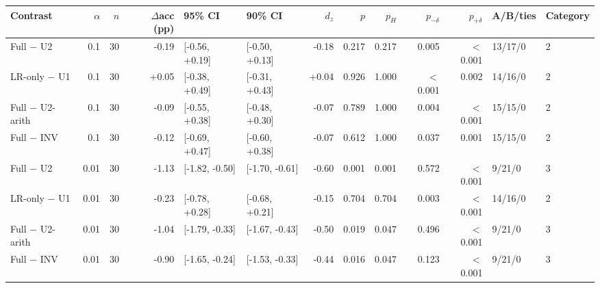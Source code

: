 \begin{tabular}{lrrrllrrrrrll}
\toprule
Contrast & $\alpha$ & $n$ & $\Delta$acc (pp) & 95\% CI & 90\% CI & $d_z$ & $p$ & $p_H$ & $p_{-\delta}$ & $p_{+\delta}$ & A/B/ties & Category \\
\midrule
Full $-$ U2 & 0.1 & 30 & -0.19 & [-0.56, +0.19] & [-0.50, +0.13] & -0.18 & 0.217 & 0.217 & 0.005 & $<$0.001 & 13/17/0 & 2 \\
LR-only $-$ U1 & 0.1 & 30 & +0.05 & [-0.38, +0.49] & [-0.31, +0.43] & +0.04 & 0.926 & 1.000 & $<$0.001 & 0.002 & 14/16/0 & 2 \\
Full $-$ U2-arith & 0.1 & 30 & -0.09 & [-0.55, +0.38] & [-0.48, +0.30] & -0.07 & 0.789 & 1.000 & 0.004 & $<$0.001 & 15/15/0 & 2 \\
Full $-$ INV & 0.1 & 30 & -0.12 & [-0.69, +0.47] & [-0.60, +0.38] & -0.07 & 0.612 & 1.000 & 0.037 & 0.001 & 15/15/0 & 2 \\
Full $-$ U2 & 0.01 & 30 & -1.13 & [-1.82, -0.50] & [-1.70, -0.61] & -0.60 & 0.001 & 0.001 & 0.572 & $<$0.001 & 9/21/0 & 3 \\
LR-only $-$ U1 & 0.01 & 30 & -0.23 & [-0.78, +0.28] & [-0.68, +0.21] & -0.15 & 0.704 & 0.704 & 0.003 & $<$0.001 & 14/16/0 & 2 \\
Full $-$ U2-arith & 0.01 & 30 & -1.04 & [-1.79, -0.33] & [-1.67, -0.43] & -0.50 & 0.019 & 0.047 & 0.496 & $<$0.001 & 9/21/0 & 3 \\
Full $-$ INV & 0.01 & 30 & -0.90 & [-1.65, -0.24] & [-1.53, -0.33] & -0.44 & 0.016 & 0.047 & 0.123 & $<$0.001 & 9/21/0 & 3 \\
\bottomrule
\end{tabular}
